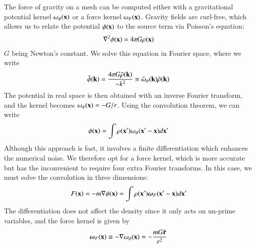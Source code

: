 The force of gravity on a mesh can be computed either with a gravitational potential  kernel $\omega_{\phi} ({\bf x})$
  or a force  kernel $\omega_{F} ({\bf x})$.
Gravity fields are curl-free, which allows us to relate the potential $\phi({\bf x})$ to the source term via Poisson's equation: 
\begin{eqnarray}
\nabla^{2}\phi({\bf x}) = 4 \pi G \rho({\bf x})
\label{eq:poisson}
\end{eqnarray}
$G$ being Newton's constant. We solve this equation in Fourier space, where we write
\begin{eqnarray}
 \tilde{\phi}({\bf k}) = \frac{4 \pi G \tilde{\rho}({\bf k})}{- k^{2}} \equiv \tilde{\omega}_{\phi}({\bf k})\tilde{\rho}({\bf k})
\label{eq:poissonFourier}
\end{eqnarray}
The potential in real space is then obtained with an inverse Fourier transform, and the kernel becomes $\omega_{\phi} ({\bf x}) = -G/r$.
Using the convolution theorem, we can write
\begin{eqnarray}
 \phi({\bf x}) = \int \rho({\bf x'}) \omega_{\phi}({\bf x'} - {\bf x}) d{\bf x'}
\label{eq:poisson_solution_pot}
\end{eqnarray}
Although this approach is fast, it involves a finite differentiation which enhances the numerical noise.
We therefore opt for a force kernel, which is more accurate but has the inconvenient to require four extra Fourier transforms.
In this case, we must solve the convolution in three dimensions:
\begin{eqnarray}
 F({\bf x}) = - m {\bf \nabla} \phi({\bf x})   = \int \rho({\bf x'}) \mbox{\boldmath $\omega$}_{F}({\bf x'} - {\bf x}) d{\bf x'}                                      
\label{eq:poisson_solution_force}
\end{eqnarray}
The differentiation does not affect the density since it only acts on un-prime variables,
and the force kernel is given by 
\begin{eqnarray}
\mbox{\boldmath $\omega$}_{F}({\bf x}) \equiv - {\bf \nabla}\omega_{\phi}({\bf x}) = - \frac{mG \hat{\bf r}}{r^{2}}
\end{eqnarray}


